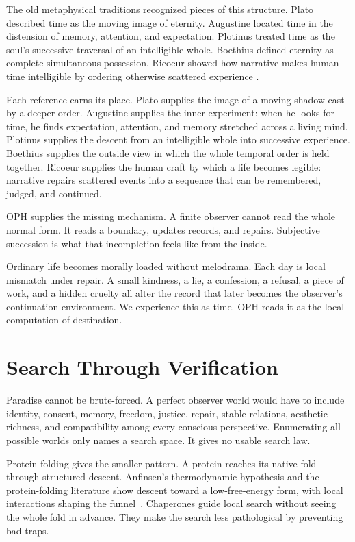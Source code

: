 \documentclass[11pt]{article}
\theoremstyle{remark}
\theoremstyle{plain}
\begin{document}
The old metaphysical traditions recognized pieces of this structure. Plato
described time as the moving image of eternity. Augustine located time in the
distension of memory, attention, and expectation. Plotinus treated time as the
soul's successive traversal of an intelligible whole. Boethius defined eternity
as complete simultaneous possession. Ricoeur showed how narrative makes human
time intelligible by ordering otherwise scattered experience
\cite{PlatoTimaeus,AugustineConfessions,PlotinusEnneads,BoethiusConsolation,Ricoeur1984}.

Each reference earns its place. Plato supplies the image of a moving
shadow cast by a deeper order. Augustine supplies the inner experiment: when he
looks for time, he finds expectation, attention, and memory stretched across a
living mind. Plotinus supplies the descent from an intelligible whole into
successive experience. Boethius supplies the outside view in which the whole
temporal order is held together. Ricoeur supplies the human craft by which a
life becomes legible: narrative repairs scattered events into a sequence that
can be remembered, judged, and continued.

OPH supplies the missing mechanism. A finite observer cannot read the whole
normal form. It reads a boundary, updates records, and repairs. Subjective succession is what
that incompletion feels like from the inside.

Ordinary life becomes morally loaded without melodrama. Each
day is local mismatch under repair. A small kindness, a lie, a confession, a
refusal, a piece of work, and a hidden cruelty all alter the record that later
becomes the observer's continuation environment. We experience this as time.
OPH reads it as the local computation of destination.

\section{Search Through Verification}

Paradise cannot be brute-forced. A perfect observer world would have to include
identity, consent, memory, freedom, justice, repair, stable relations, aesthetic
richness, and compatibility among every conscious perspective. Enumerating all
possible worlds only names a search space. It gives no usable search law.

Protein folding gives the smaller pattern. A protein reaches its native fold
through structured descent. Anfinsen's thermodynamic hypothesis and the
protein-folding literature show descent toward a low-free-energy form, with
local interactions shaping the funnel~\cite{Anfinsen1973,Levinthal1969,Dill1997}.
Chaperones guide local search without seeing the whole fold in advance. They
make the search less pathological by preventing bad traps.
\end{document}
